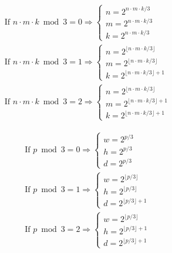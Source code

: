 \documentclass[11pt,a4paper,titlepage]{article}
\begin{document}
	\begin{minipage}[l]{0.6\textwidth}
		\begin{align*}
			& \text{If } n \cdot m \cdot k \bmod 3 = 0 \Rightarrow \begin{cases} n = 2^{n \cdot m \cdot k/3}\\ m = 2^{n \cdot m \cdot k/3}\\ k = 2^{n \cdot m \cdot k/3}\end{cases}\\
			& \text{If } n \cdot m \cdot k \bmod 3 = 1 \Rightarrow \begin{cases} n = 2^{\lfloor n \cdot m \cdot k/3 \rfloor}\\ m = 2^{\lfloor n \cdot m \cdot k/3 \rfloor}\\ k = 2^{\lfloor n \cdot m \cdot k/3 \rfloor + 1}\end{cases}\\
			& \text{If } n \cdot m \cdot k \bmod 3 = 2 \Rightarrow \begin{cases} n = 2^{\lfloor n \cdot m \cdot k/3 \rfloor}\\ m = 2^{\lfloor n \cdot m \cdot k/3 \rfloor + 1}\\ k = 2^{\lfloor n \cdot m \cdot k/3 \rfloor + 1}\end{cases}
		\end{align*}
	\end{minipage}
	\begin{minipage}[r]{0.4\textwidth}
		\begin{align*}
			& \text{If } p \bmod 3 = 0 \Rightarrow \begin{cases} w = 2^{p/3}\\ h = 2^{p/3}\\ d = 2^{p/3}\end{cases}\\
			& \text{If } p \bmod 3 = 1 \Rightarrow \begin{cases} w = 2^{\lfloor p/3 \rfloor}\\ h = 2^{\lfloor p/3 \rfloor}\\ d = 2^{\lfloor p/3 \rfloor + 1}\end{cases}\\
			& \text{If } p \bmod 3 = 2 \Rightarrow \begin{cases} w = 2^{\lfloor p/3 \rfloor}\\ h = 2^{\lfloor p/3 \rfloor + 1}\\ d = 2^{\lfloor p/3 \rfloor + 1}\end{cases}
		\end{align*}
	\end{minipage}\\
	
\end{document}
